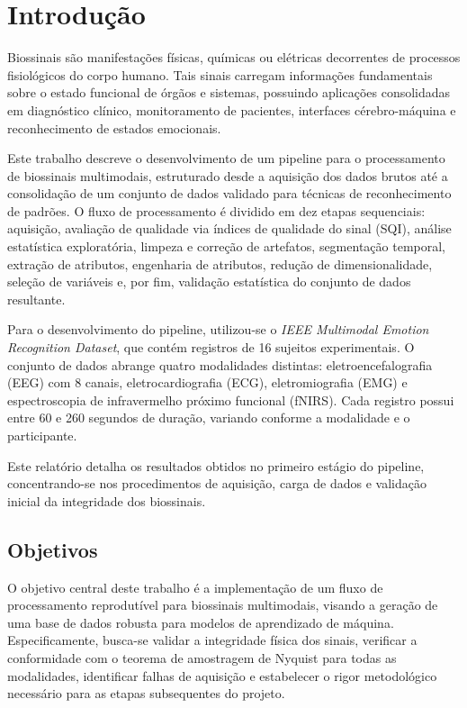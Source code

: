\chapter{Introdução}
\label{cap:introducao}

Biossinais são manifestações físicas, químicas ou elétricas decorrentes de processos fisiológicos do corpo humano. Tais sinais carregam informações fundamentais sobre o estado funcional de órgãos e sistemas, possuindo aplicações consolidadas em diagnóstico clínico, monitoramento de pacientes, interfaces cérebro-máquina e reconhecimento de estados emocionais.

Este trabalho descreve o desenvolvimento de um pipeline para o processamento de biossinais multimodais, estruturado desde a aquisição dos dados brutos até a consolidação de um conjunto de dados validado para técnicas de reconhecimento de padrões. O fluxo de processamento é dividido em dez etapas sequenciais: aquisição, avaliação de qualidade via índices de qualidade do sinal (SQI), análise estatística exploratória, limpeza e correção de artefatos, segmentação temporal, extração de atributos, engenharia de atributos, redução de dimensionalidade, seleção de variáveis e, por fim, validação estatística do conjunto de dados resultante.

Para o desenvolvimento do pipeline, utilizou-se o \textit{IEEE Multimodal Emotion Recognition Dataset}, que contém registros de 16 sujeitos experimentais. O conjunto de dados abrange quatro modalidades distintas: eletroencefalografia (EEG) com 8 canais, eletrocardiografia (ECG), eletromiografia (EMG) e espectroscopia de infravermelho próximo funcional (fNIRS). Cada registro possui entre 60 e 260 segundos de duração, variando conforme a modalidade e o participante.

Este relatório detalha os resultados obtidos no primeiro estágio do pipeline, concentrando-se nos procedimentos de aquisição, carga de dados e validação inicial da integridade dos biossinais.

\section{Objetivos}

O objetivo central deste trabalho é a implementação de um fluxo de processamento reprodutível para biossinais multimodais, visando a geração de uma base de dados robusta para modelos de aprendizado de máquina. Especificamente, busca-se validar a integridade física dos sinais, verificar a conformidade com o teorema de amostragem de Nyquist para todas as modalidades, identificar falhas de aquisição e estabelecer o rigor metodológico necessário para as etapas subsequentes do projeto.

